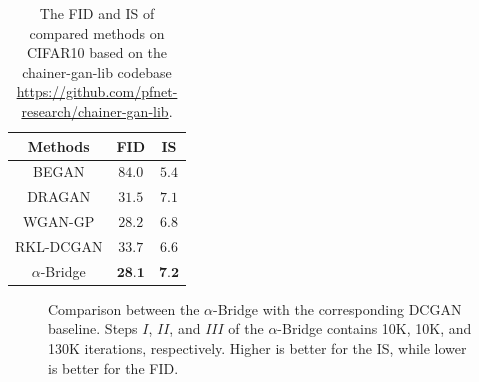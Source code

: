 \documentclass[letterpaper]{article} %
\begin{document}
\begin{table}[H] \centering
	\caption{The FID and IS of compared methods on CIFAR10 based on the chainer-gan-lib codebase \url{https://github.com/pfnet-research/chainer-gan-lib}.}\label{tab:fid_is_cifar}
	\begin{tabular}{ccc}\hline\hline
		Methods         & FID    & IS  \\ \hline
		BEGAN           & $84.0$ & $5.4$ \\ 
		DRAGAN          & $31.5$ & $7.1$ \\ 
		WGAN-GP         & $28.2$ & $6.8$ \\ 
		RKL-DCGAN       & $33.7$ & $6.6$ \\ \hline
		$\alpha$-Bridge & $\textbf{28.1}$ & $\textbf{7.2}$ \\ \hline\hline
	\end{tabular}
\end{table}




\begin{figure}[H]
	\begin{center}
		\caption{\small Comparison between the $\alpha$-Bridge with the corresponding DCGAN baseline. Steps $I$, $I\!I$, and $I\!I\!I$ of the $\alpha$-Bridge contains 10K, 10K, and 130K iterations, respectively. Higher is better for the IS, while lower is better for the FID.
		}
		\label{fig:CIFAR10_IS_FID}
	\end{center}
\end{figure}
\end{document}
